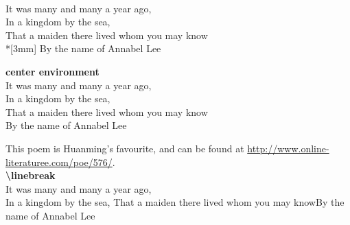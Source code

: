 \documentclass{article}
\begin{document}
	{\centering
	\\
	It was many and many a year ago,\\
	In a kingdom by the sea,\\[3mm]
	That a maiden there lived whom you may know\\*[3mm]
	By the name of Annabel Lee
	
	}
	
	\begin{center}
	{\large\bfseries center environment}\\
	It was many and many a year ago,\\
	In a kingdom by the sea,\\
	That a maiden there lived whom you may know\\
	By the name of Annabel Lee
	\end{center}
	This poem is Huanming's favourite, and can be found at \url{http://www.online-literaturee.com/poe/576/}.\\
	
	{\large\bfseries \textbackslash linebreak}\\
	It was many and many a year ago,\\
	In a kingdom by the sea,\linebreak
	That a maiden there lived whom you may know\linebreak[0]
	By the name of Annabel Lee
\end{document}
